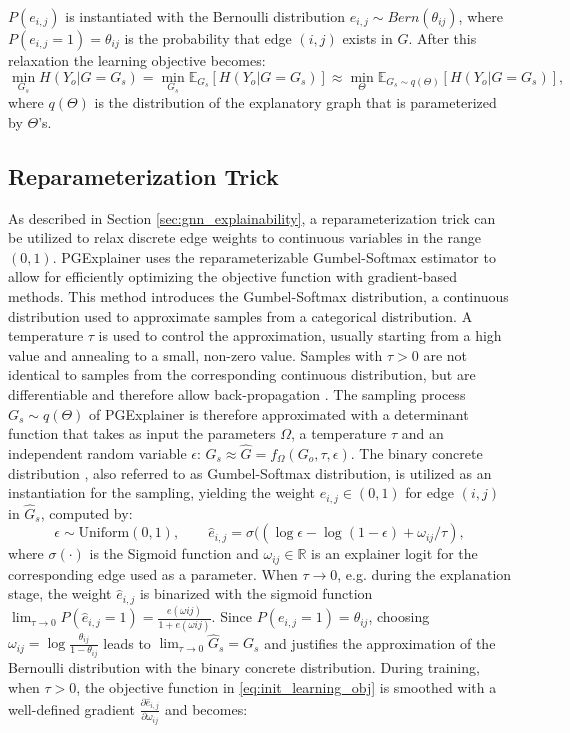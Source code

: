  $P(e_{i,j})$ is instantiated with the Bernoulli distribution $e_{i,j} \sim Bern(\theta_{ij})$, where $P(e_{i,j} = 1) = \theta_{ij}$ is the probability that edge $(i,j)$ exists in $G$.
After this relaxation the learning objective becomes:
\begin{equation}
    \label{eq:init_learning_obj}
    \min_{G_s}H(Y_o|G = G_s) = \min_{G_s} \mathbb{E}_{G_s}[H(Y_o|G = G_s)] \approx \min_{\Theta} \mathbb{E}_{G_s \sim q(\Theta)}[H(Y_o|G = G_s)],
\end{equation}
where $q(\Theta)$ is the distribution of the explanatory graph that is parameterized by $\Theta$'s.

\subsection{Reparameterization Trick}
\label{sec:Reparameterization_Trick}
As described in Section \ref{sec:gnn_explainability}, a reparameterization trick can be utilized to relax discrete edge weights to continuous variables in the range $(0,1)$. PGExplainer uses the reparameterizable Gumbel-Softmax estimator \cite{jang2016categorical} to allow for efficiently optimizing the objective function with gradient-based methods. This method introduces the Gumbel-Softmax distribution, a continuous distribution used to approximate samples from a categorical distribution. A temperature $\tau$ is used to control the approximation, usually starting from a high value and annealing to a small, non-zero value. Samples with $\tau > 0$ are not identical to samples from the corresponding continuous distribution, but are differentiable and therefore allow back-propagation \cite{abid2019concrete}. The sampling process $G_s \sim q(\Theta)$ of PGExplainer is therefore approximated with a determinant function that takes as input the parameters $\Omega$, a temperature $\tau$ and an independent random variable $\epsilon$: $G_s \approx \hat{G}=f_\Omega(G_o,\tau,\epsilon)$. The binary concrete distribution \cite{maddison2016concrete}, also referred to as Gumbel-Softmax distribution, is utilized as an instantiation for the sampling, yielding the weight $\hat{e}_{i,j} \in (0,1)$ for edge $(i,j)$ in $\hat{G}_s$, computed by:
\begin{equation}
    \label{eq:reparam_trick}
    \epsilon \sim \text{Uniform}(0,1), \qquad \hat{e}_{i,j}=\sigma((\log \epsilon - \log(1-\epsilon)+\omega_{ij}/\tau),
\end{equation}
where $\sigma(\cdot)$ is the Sigmoid function and $\omega_{ij} \in \mathbb{R}$ is an explainer logit for the corresponding edge used as a parameter. When $\tau \rightarrow 0$, e.g. during the explanation stage, the weight $\hat{e}_{i,j}$ is binarized with the sigmoid function $\lim_{\tau\rightarrow 0}P(\hat{e}_{i,j} = 1) = \frac{e(\omega{ij})}{1+e(\omega{ij})}$. Since $P(e_{i,j} = 1) = \theta_{ij}$, choosing $\omega_{ij} = \log\frac{\theta_{ij}}{1-\theta_{ij}}$ leads to $\lim_{\tau\rightarrow 0}\hat{G}_s = G_s$ and justifies the approximation of the Bernoulli distribution with the binary concrete distribution. During training, when $\tau > 0$, the objective function in \eqref{eq:init_learning_obj} is smoothed with a well-defined gradient $\frac{\partial\hat{e}_{i,j}}{\partial\omega_{ij}}$ and becomes:
